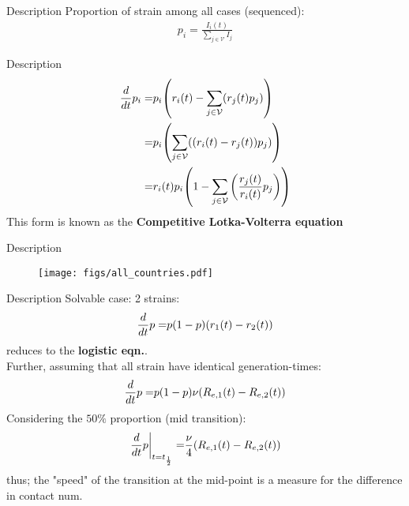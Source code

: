 \documentclass{beamer}
\begin{document}
\begin{frame}{Description}
Proportion of strain among all cases (sequenced):
\begin{align}
p_{i} = \frac{I_{i}(t)}{\sum_{j \in \mathcal{V}}I_{j}}
\end{align}
\end{frame}

\begin{frame}{Description}
\begin{align*}
\dv{}{t} p_{i}
=& p_{i} \qty(r_{i}(t) - \sum_{j \in \mathcal{V}} (r_{j}(t) p_{j})) \\
=& p_{i} \qty(\sum_{j \in \mathcal{V}} ((r_{i}(t) - r_{j}(t)) p_{j})) \\
=& r_{i}(t) p_{i} \qty(1 - \sum_{j \in \mathcal{V}} \qty(\frac{r_{j}(t)}{r_{i}(t)} p_{j}))
\end{align*}
This form is known as the \textbf{Competitive Lotka-Volterra equation} 
\cite{Smale_1976, Bomze_1983}
\end{frame}

\begin{frame}{Description}
\begin{figure}[H]
\centering
\texttt{[image: figs/all\_countries.pdf]}
\end{figure}
\end{frame}

\begin{frame}{Description}
Solvable case: 2 strains:
\begin{align*}
\dv{}{t} p
=& p (1-p) \qty(r_{1}(t) - r_{2}(t)) \\
\end{align*}
reduces 
to the \textbf{logistic eqn.}. \\
Further, assuming that all strain have identical generation-times:
\begin{align*}
\dv{}{t} p
=& p (1-p) \nu \qty(R_{e, 1}(t) - R_{e, 2}(t)) \\
\end{align*}
Considering the $50\%$ proportion (mid transition): %
\begin{align*}
\eval{\dv{}{t} p}_{t=t_{\frac{1}{2}}}
=& \frac{\nu}{4} \qty(R_{e, 1}(t) - R_{e, 2}(t)) \\
\end{align*}
thus; the "speed" of the transition at the mid-point is a measure for the difference in contact num. 
\end{frame}
\end{document}
